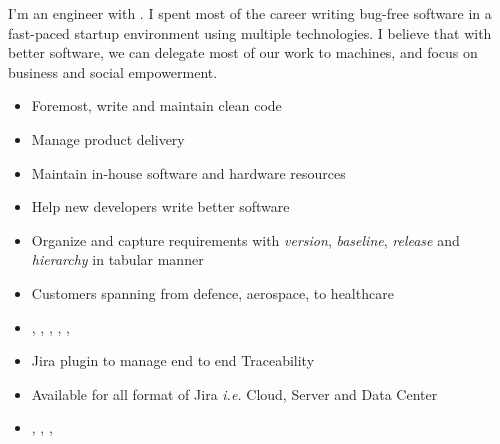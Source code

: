 \documentclass[10pt,a4paper,ragged2e]{altacv}
\begin{document}


\begin{fullwidth}
\makecvheader
{}
I'm an engineer with .  I spent most of the career writing bug-free software in a fast-paced startup environment using multiple technologies. I believe that with better software, we can delegate most of our work to machines, and focus on business and social empowerment.
\end{fullwidth}



\begin{itemize}
\item Foremost, write and maintain clean code
\item Manage product delivery
\item Maintain in-house software and hardware resources
\item Help new developers write better software
\end{itemize}


\begin{itemize}
\item Organize and capture requirements with \emph{version}, \emph{baseline}, \emph{release} and \emph{hierarchy} in tabular manner
\item Customers spanning from defence, aerospace, to healthcare
\item {}, , , , , 
\end{itemize}

\divider

\begin{itemize}
\item Jira plugin to manage end to end Traceability
\item Available for all format of Jira \emph{i.e.} Cloud, Server and Data Center
\item {}, , , 
\end{itemize}
\end{document}
